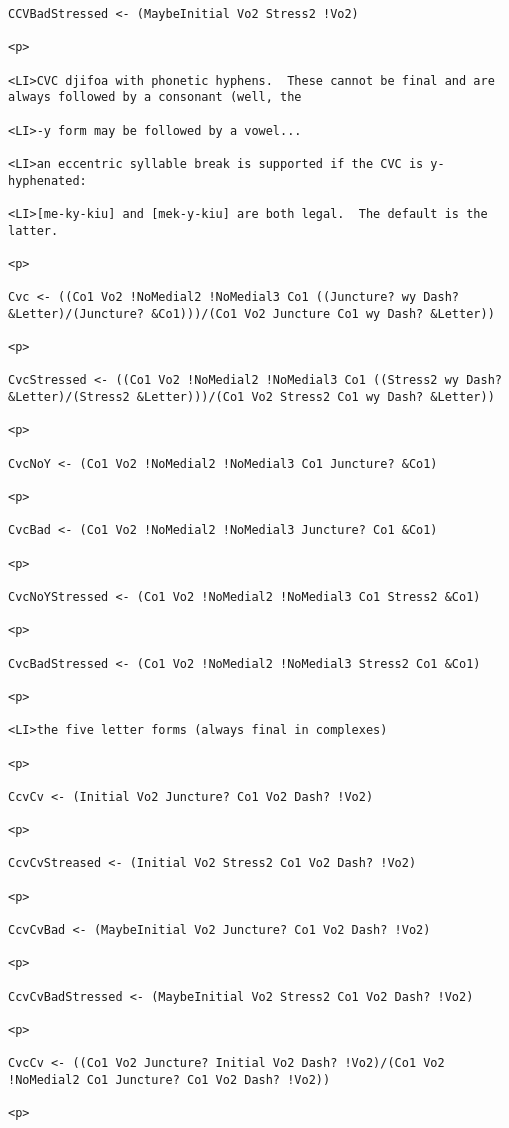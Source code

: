 \documentclass[12pt]{article}
\begin{document}
\begin{lstlisting}
CCVBadStressed <- (MaybeInitial Vo2 Stress2 !Vo2)

<p>

<LI>CVC djifoa with phonetic hyphens.  These cannot be final and are always followed by a consonant (well, the

<LI>-y form may be followed by a vowel...

<LI>an eccentric syllable break is supported if the CVC is y-hyphenated:

<LI>[me-ky-kiu] and [mek-y-kiu] are both legal.  The default is the latter.

<p>

Cvc <- ((Co1 Vo2 !NoMedial2 !NoMedial3 Co1 ((Juncture? wy Dash? &Letter)/(Juncture? &Co1)))/(Co1 Vo2 Juncture Co1 wy Dash? &Letter))

<p>

CvcStressed <- ((Co1 Vo2 !NoMedial2 !NoMedial3 Co1 ((Stress2 wy Dash? &Letter)/(Stress2 &Letter)))/(Co1 Vo2 Stress2 Co1 wy Dash? &Letter))

<p>

CvcNoY <- (Co1 Vo2 !NoMedial2 !NoMedial3 Co1 Juncture? &Co1)

<p>

CvcBad <- (Co1 Vo2 !NoMedial2 !NoMedial3 Juncture? Co1 &Co1)

<p>

CvcNoYStressed <- (Co1 Vo2 !NoMedial2 !NoMedial3 Co1 Stress2 &Co1)

<p>

CvcBadStressed <- (Co1 Vo2 !NoMedial2 !NoMedial3 Stress2 Co1 &Co1)

<p>

<LI>the five letter forms (always final in complexes)

<p>

CcvCv <- (Initial Vo2 Juncture? Co1 Vo2 Dash? !Vo2)

<p>

CcvCvStreased <- (Initial Vo2 Stress2 Co1 Vo2 Dash? !Vo2)

<p>

CcvCvBad <- (MaybeInitial Vo2 Juncture? Co1 Vo2 Dash? !Vo2)

<p>

CcvCvBadStressed <- (MaybeInitial Vo2 Stress2 Co1 Vo2 Dash? !Vo2)

<p>

CvcCv <- ((Co1 Vo2 Juncture? Initial Vo2 Dash? !Vo2)/(Co1 Vo2 !NoMedial2 Co1 Juncture? Co1 Vo2 Dash? !Vo2))

<p>


\end{lstlisting}
\end{document}
